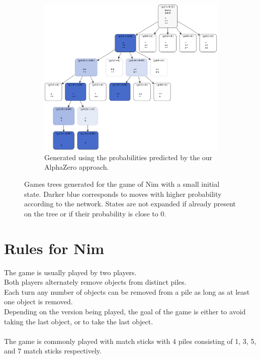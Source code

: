 \documentclass[12pt,a4paper]{article}
\begin{document}
\begin{figure}
\begin{subfigure}{.5\textwidth}
  \centering
  \includegraphics[width=\linewidth]{img/nim-alpha-zero.png}
  \caption{Generated using the probabilities predicted by the our AlphaZero approach.}
\end{subfigure}
\caption{Games trees generated for the game of Nim with a small initial state. Darker blue corresponds to moves with higher probability according to the network. States are not expanded if already present on the tree or if their probability is close to 0.}
\end{figure}






\appendix
\section{Rules for Nim}
\label{a:nimrules}
The game is usually played by two players.  \\
Both players alternately remove objects from distinct piles. \\
Each turn any number of objects can be removed from a pile as long as at least one object is removed. \\
Depending on the version being played, the goal of the game is either to avoid taking the last object, or to take the last object. \\ 
\\
The game is commonly played with match sticks with 4 piles consisting of 1, 3, 5, and 7 match sticks respectively.
\end{document}
